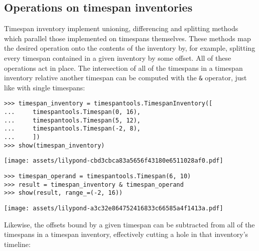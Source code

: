 \subsection{Operations on timespan inventories} %

Timespan inventory implement unioning, differencing and splitting methods which
parallel those implemented on timespans themselves. These methods
map the desired operation onto the contents of the inventory by, for example,
splitting every timespan contained in a given inventory by some offset. All of
these operations act in place. The intersection of all of the timespans in a
timespan inventory relative another timespan can be computed with the
\texttt{\&} operator, just like with single timespans:

\begin{comment}
<abjad>
timespan_inventory = timespantools.TimespanInventory([
    timespantools.Timespan(0, 16),
    timespantools.Timespan(5, 12),
    timespantools.Timespan(-2, 8),
    ])
show(timespan_inventory)
timespan_operand = timespantools.Timespan(6, 10)
result = timespan_inventory & timespan_operand
show(result, range_=(-2, 16))
</abjad>
\end{comment}

\begin{singlespacing}
\vspace{-0.5\baselineskip}
\begin{lstlisting}
>>> timespan_inventory = timespantools.TimespanInventory([
...     timespantools.Timespan(0, 16),
...     timespantools.Timespan(5, 12),
...     timespantools.Timespan(-2, 8),
...     ])
>>> show(timespan_inventory)
\end{lstlisting}
\noindent\texttt{[image: assets/lilypond-cbd3cbca83a5656f43180e6511028af0.pdf]}
\begin{lstlisting}
>>> timespan_operand = timespantools.Timespan(6, 10)
>>> result = timespan_inventory & timespan_operand
>>> show(result, range_=(-2, 16))
\end{lstlisting}
\noindent\texttt{[image: assets/lilypond-a3c32e864752416833c66585a4f1413a.pdf]}
\end{singlespacing}

\noindent Likewise, the offsets bound by a given timespan can be subtracted
from all of the timespans in a timespan inventory, effectively cutting a hole
in that inventory's timeline:

\begin{comment}
<abjad>
timespan_inventory = timespantools.TimespanInventory([
    timespantools.Timespan(0, 16),
    timespantools.Timespan(5, 12),
    timespantools.Timespan(-2, 8),
    ])
show(timespan_inventory)
timespan_operand = timespantools.Timespan(6, 10)
result = timespan_inventory - timespan_operand
show(result)
</abjad>
\end{comment}


